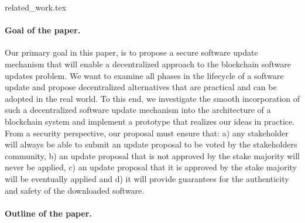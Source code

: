 
{related_work.tex}

\paragraph{Goal of the paper.}
Our primary goal in this paper, is to propose a secure software update mechanism that will enable a decentralized approach to the blockchain software updates problem. We want to examine all phases in the lifecycle of a software update and propose decentralized alternatives that are practical and can be adopted in the real world. To this end, we investigate the smooth incorporation of such a decentralized software update mechanism into the architecture of a blockchain system and implement a prototype that realizes our ideas in practice. From a security perspective, our proposal must ensure that:
a) any stakeholder will always be able to submit an update proposal to be voted by the stakeholders community, b) an update proposal that is not approved by the stake majority will never be applied, c) an update proposal that it is approved by the stake majority will be eventually applied
and d) it will provide guarantees for the authenticity and safety of the downloaded software.

\paragraph{Outline of the paper.}
